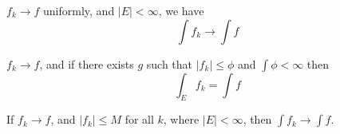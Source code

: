 \documentclass[openany]{book}
\begin{document}
\begin{thm}
    $f_k\to f$ uniformly, and $|E|<\infty$, we have 
    \begin{equation*}
        \int f_k\to \int f
    \end{equation*}
\end{thm}
\begin{thm}
    $f_k\to f$, and if there exists $g$ such that $|f_k|\leq\phi$ and $\int\phi<\infty$ then 
    \begin{equation*}
        \int_Ef_k=\int f
    \end{equation*}
\end{thm}




\begin{thm}[5.37]
    If $f_k\to f$, and $|f_k|\leq M$ for all $k$, where $|E|<\infty$, then $\int f_k\to \int f$.
\end{thm}
\end{document}
